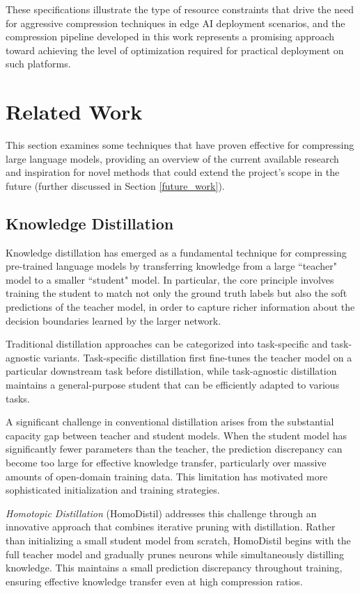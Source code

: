 These specifications illustrate the type of resource constraints that drive the need for aggressive compression techniques in edge AI deployment scenarios, and the compression pipeline developed in this work represents a promising approach toward achieving the level of optimization required for practical deployment on such platforms.

\section{Related Work}

This section examines some techniques that have proven effective for compressing large language models, providing an overview of the current available research and inspiration for novel methods that could extend the project's scope in the future (further discussed in Section \ref{future_work}).

\subsection{Knowledge Distillation} \label{distillation_paragraph}

Knowledge distillation \cite{distillation} has emerged as a fundamental technique for compressing pre-trained language models by transferring knowledge from a large ``teacher" model to a smaller ``student" model. In particular, the core principle involves training the student to match not only the ground truth labels but also the soft predictions of the teacher model, in order to capture richer information about the decision boundaries learned by the larger network.

Traditional distillation approaches can be categorized into task-specific and task-agnostic variants. Task-specific distillation first fine-tunes the teacher model on a particular downstream task before distillation, while task-agnostic distillation maintains a general-purpose student that can be efficiently adapted to various tasks.

A significant challenge in conventional distillation arises from the substantial capacity gap between teacher and student models. When the student model has significantly fewer parameters than the teacher, the prediction discrepancy can become too large for effective knowledge transfer, particularly over massive amounts of open-domain training data. This limitation has motivated more sophisticated initialization and training strategies.

\textit{Homotopic Distillation} (HomoDistil) \cite{homodistil} addresses this challenge through an innovative approach that combines iterative pruning with distillation. Rather than initializing a small student model from scratch, HomoDistil begins with the full teacher model and gradually prunes neurons while simultaneously distilling knowledge. This maintains a small prediction discrepancy throughout training, ensuring effective knowledge transfer even at high compression ratios.

